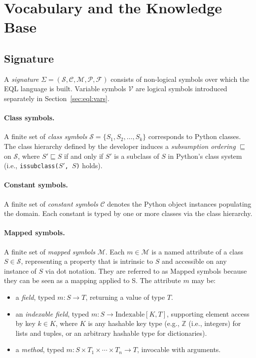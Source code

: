 \documentclass[11pt, a4paper]{article}
\theoremstyle{plain}
\theoremstyle{definition}
\theoremstyle{remark}
\begin{document}
\section{Vocabulary and the Knowledge Base}
\label{sec:eql:vocab}

\subsection{Signature}

A \emph{signature} $\Sigma = (\mathcal{S}, \mathcal{C}, \mathcal{M}, \mathcal{P}, \mathcal{F})$
consists of non-logical symbols over which the EQL language is built.  Variable symbols
$\mathcal{V}$ are logical symbols introduced separately in Section~\ref{sec:eql:vars}.

\paragraph{Class symbols.}
A finite set of \emph{class symbols} $\mathcal{S} = \{S_1, S_2, \ldots, S_k\}$ corresponds to
Python classes.  The class hierarchy defined by the developer induces a \emph{subsumption
ordering} $\sqsubseteq$ on $\mathcal{S}$, where $S' \sqsubseteq S$ if and only if $S'$ is a
subclass of $S$ in Python's class system (i.e., \texttt{issubclass($S'$, $S$)} holds).

\paragraph{Constant symbols.}
A finite set of \emph{constant symbols} $\mathcal{C}$ denotes the Python object instances
populating the domain.  Each constant is typed by one or more classes via the class hierarchy.

\paragraph{Mapped symbols.}
A finite set of \emph{mapped symbols} $\mathcal{M}$.  Each $m \in \mathcal{M}$ is a named
attribute of a class $S \in \mathcal{S}$, representing a property that is intrinsic to $S$
and accessible on any instance of $S$ via dot notation. They are referred to as Mapped symbols because they can be seen as a mapping applied to S. The attribute $m$ may be:

\begin{itemize}
  \item a \emph{field}, typed $m : S \to T$, returning a value of type $T$.
  \item an \emph{indexable field}, typed $m : S \to \mathrm{Indexable}[K, T]$, supporting
        element access by key $k \in K$, where $K$ is any hashable key type (e.g.,
        $\mathbb{Z}$ (i.e., integers) for lists and tuples, or an arbitrary hashable type for dictionaries).
  \item a \emph{method}, typed $m : S \times T_1 \times \cdots \times T_n \to T$, invocable
        with arguments.
\end{itemize}
\end{document}
